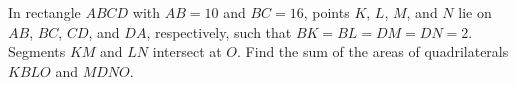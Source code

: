 In rectangle $ABCD$ with $AB=10$ and $BC=16$, points $K$, $L$, $M$, and $N$ lie on $AB$, $BC$, $CD$, and $DA$, respectively, such that $BK=BL=DM=DN=2$. Segments $KM$ and $LN$ intersect at $O$. Find the sum of the areas of quadrilaterals $KBLO$ and $MDNO$.
